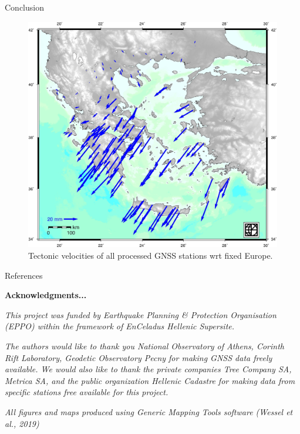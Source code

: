 \documentclass[final,a0,portrait]{beamer}
\newlength{\onecolwid}
\begin{document}
\begin{frame}[t]
\begin{columns}[t]
\begin{column}{\onecolwid}
\begin{block}{Conclusion}
{}
\begin{figure}
    \includegraphics[width=.9\onecolwid]{testvel.jpg}
    \caption{Tectonic velocities of all processed GNSS stations wrt fixed Europe.}
    \label{fig:vels}
\end{figure}
\end{block}


\begin{block}{References}

\nocite{*} %
\footnotesize{
\vspace{0.75in}}

\textbf{Acknowledgments...}
\par\textit{\footnotesize This project was funded by Earthquake Planning \& Protection Organisation (EPPO) within the framework of EnCeladus Hellenic Supersite. }
\par\textit{\footnotesize The authors would like to thank you National Observatory of Athens, Corinth Rift Laboratory, Geodetic Observatory Pecny for making GNSS data freely available. We would also like to thank the private companies Tree Company SA, Metrica SA, and the public organization Hellenic Cadastre for making data from specific stations free available for this project.}
\par\textit{\footnotesize All figures and maps produced using Generic Mapping Tools software (Wessel et al., 2019)}
\end{block}


\end{column}
\end{columns}
\end{frame}
\end{document}

